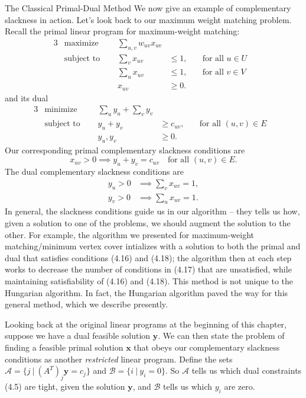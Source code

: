 \begin{section}{The Classical Primal-Dual Method}
	We now give an example of complementary slackness in action. Let's look back to our maximum 
	weight matching problem. Recall the primal linear program for maximum-weight matching:
	\begin{alignat}{3}
		& \text{maximize } & \sum_{u,v} w_{uv} x_{uv}& \\
		& \text{subject to } \quad & \sum_{v} x_{uv} & \leq 1, & \quad \text{for all } u\in U& \\
				     &\quad & \sum_{u} x_{uv} & \leq 1, & \quad \text{for all } 
				     v\in V & \\
				&& x_{uv} & \geq 0.
	\end{alignat}
	and its dual
	\begin{alignat}{3}
		& \text{minimize } & \sum_u y_u + \sum_v y_v& \\
		& \text{subject to } \quad & y_u + y_v & \geq c_{uv}, & \quad \text{for all } 
					(u,v)\in E & \\
				    && y_u,y_v & \geq 0.
	\end{alignat}
	Our corresponding primal complementary slackness conditions are
	\begin{equation}
		x_{uv} > 0 \implies y_u + y_v = c_{uv} \quad \text{for all } (u,v)\in E.
	\end{equation}
	The dual complementary slackness conditions are
	\begin{align}
		y_u > 0 &\implies \sum_v x_{uv} = 1,\\
		y_v > 0 &\implies \sum_u x_{uv} = 1.
	\end{align}
	In general, the slackness conditions guide us in our algorithm -- they tells us how, given a 
	solution to one of the problems, we should augment the solution to the other. For example, the 
	algorithm we presented for maximum-weight matching/minimum vertex cover intializes with 
	a solution to both the primal and dual that satisfies conditions (4.16) and (4.18); the algorithm 
	then at each step works to decrease the number of conditions in (4.17) that are unsatisfied, 
	while maintaining satisfiability of (4.16) and (4.18). This method is not unique to the Hungarian 
	algorithm. In fact, the Hungarian algorithm paved the way for this general method, which we 
	describe presently.

	Looking back at the original linear programs at the beginning of this chapter, suppose we have 
	a dual feasible solution $\mathbf{y}$. We can then state the problem of finding a feasible 
	primal solution $\mathbf{x}$ that obeys our complementary slackness conditions as another 
	\emph{restricted} linear program. Define the sets $\mathcal{A} = \{j\ |\ (A^{T})_j\mathbf{y} = 
	c_j\}$ and 
	$\mathcal{B} = \{i\ |\ y_i = 0\}$. So $\mathcal{A}$ tells us which dual constraints (4.5) are 
	tight, 
	given the solution $\mathbf{y}$, and $\mathcal{B}$ tells us which $y_i$ are zero. 
	

\end{section}

